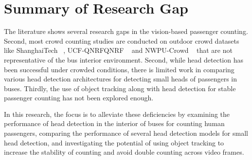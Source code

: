 \section{Summary of Research Gap}

The literature shows several research gaps in the vision-based passenger counting. Second, most crowd counting studies are conducted on outdoor crowd datasets like ShanghaiTech ~\cite{Zhu2020}, UCF-QNRFQNRF ~\cite{ucf_qnrf_dataset} and NWPU-Crowd ~\cite{wang2020nwpu} that are not representative of the bus interior environment. Second, while head detection has been successful under crowded conditions, there is limited work in comparing various head detection architectures for detecting small heads of passengers in buses. Thirdly, the use of object tracking along with head detection for stable passenger counting has not been explored enough.

In this research, the focus is to alleviate these deficiencies by examining the performance of head detection in the interior of buses for counting human passengers, comparing the performance of several head detection models for small head detection, and investigating the potential of using object tracking to increase the stability of counting and avoid double counting across video frames.